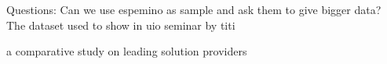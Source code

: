 Questions: Can we use espemino as sample and ask them to give bigger data? 
The dataset used to show in uio seminar by titi



a comparative study on leading solution providers













